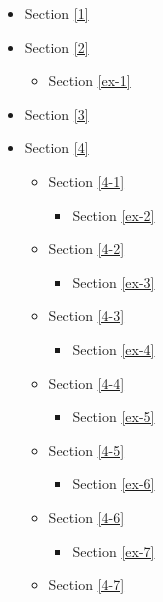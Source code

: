 \documentclass[11pt]{article}
\providecommand{\tightlist}{%
      \setlength{\itemsep}{0pt}\setlength{\parskip}{0pt}}
\begin{document}
\begin{itemize}
\tightlist
\item
  Section \ref{1}
\item
  Section \ref{2}

  \begin{itemize}
  \tightlist
  \item
    Section \ref{ex-1}
  \end{itemize}
\item
  Section \ref{3}
\item
  Section \ref{4}

  \begin{itemize}
  \tightlist
  \item
    Section \ref{4-1}

    \begin{itemize}
    \tightlist
    \item
      Section \ref{ex-2}
    \end{itemize}
  \item
    Section \ref{4-2}

    \begin{itemize}
    \tightlist
    \item
      Section \ref{ex-3}
    \end{itemize}
  \item
    Section \ref{4-3}

    \begin{itemize}
    \tightlist
    \item
      Section \ref{ex-4}
    \end{itemize}
  \item
    Section \ref{4-4}

    \begin{itemize}
    \tightlist
    \item
      Section \ref{ex-5}
    \end{itemize}
  \item
    Section \ref{4-5}

    \begin{itemize}
    \tightlist
    \item
      Section \ref{ex-6}
    \end{itemize}
  \item
    Section \ref{4-6}

    \begin{itemize}
    \tightlist
    \item
      Section \ref{ex-7}
    \end{itemize}
  \item
    Section \ref{4-7}


\end{itemize}
\end{itemize}
\end{document}
